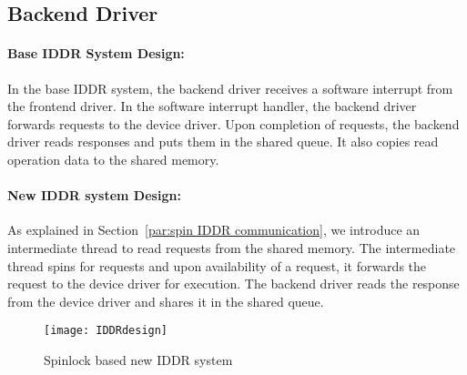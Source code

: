 \subsection{Backend Driver}
\paragraph{Base IDDR System Design:}
In the base IDDR system, the backend driver receives a software interrupt from the frontend driver. In the software interrupt handler, the backend driver forwards requests to the device driver. Upon completion of requests, the backend driver reads responses and puts them in the shared queue. It also copies read operation data to the shared memory. 

\paragraph{New IDDR system Design:}
As explained in Section~\ref{par:spin IDDR communication}, we introduce an intermediate thread to read requests from the shared memory. The intermediate thread spins for requests and upon availability of a request, it forwards the request to the device driver for execution. The backend driver reads the response from the device driver and shares it in the shared queue.
\begin{figure}[!ht]
\centering
\texttt{[image: IDDRdesign]}
\caption{Spinlock based new IDDR system}
\label{fig:new IDDR system}
\end{figure}

    
